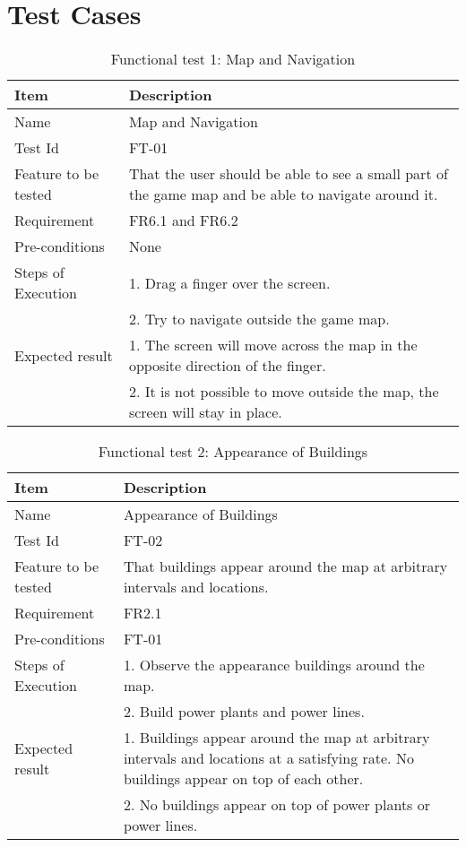\chapter{Test Cases}


\begin{table}[H]
\centering
	\begin{tabular}{ l | p{8cm} }
		\hline
		\rowcolor{lightgray}
		{\bf Item} & {\bf Description} \\ \hline
		Name & Map and Navigation \\ 
		Test Id & FT-01 \\ 
		Feature to be tested & That the user should be able to see a small part of the game map and be able to navigate around it.\\ 
		Requirement & FR6.1 and FR6.2 \\ 
		Pre-conditions & None \\ 
		Steps of Execution & 1. Drag a finger over the screen. \\
		& 2. Try to navigate outside the game map. \\
		Expected result & 1. The screen will move across the map in the opposite direction of the finger.\\ 
		& 2. It is not possible to move outside the map, the screen will stay in place. \\
		\hline
	\end{tabular}
	\caption{Functional test 1: Map and Navigation}
\end{table}

\begin{table}[H]
\centering
	\begin{tabular}{ l | p{8cm} }
		\hline
		\rowcolor{lightgray}
		{\bf Item} & {\bf Description} \\ \hline
		Name & Appearance of Buildings \\ 
		Test Id & FT-02 \\ 
		Feature to be tested & That buildings appear around the map at arbitrary intervals and locations. \\ 
		Requirement & FR2.1 \\ 
		Pre-conditions & FT-01 \\ 
		Steps of Execution & 1. Observe the appearance buildings around the map.\\
		& 2. Build power plants and power lines. \\ 
		Expected result & 1. Buildings appear around the map at arbitrary intervals and locations at a satisfying rate. No buildings appear on top of each other. \\
		& 2. No buildings appear on top of power plants or power lines. \\
		\hline
	\end{tabular}
	\caption{Functional test 2: Appearance of Buildings}
\end{table}

